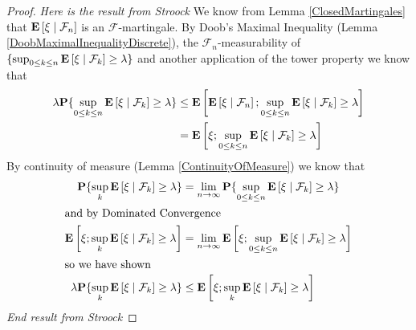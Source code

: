 \begin{proof}
\emph{Here is the result from Stroock}
We know from Lemma \ref{ClosedMartingales} that
$\textbf{E}\left[ \xi \mid \mathcal{F}_n \right]$ is an
$\mathcal{F}$-martingale.  By Doob's Maximal Inequality (Lemma
\ref{DoobMaximalInequalityDiscrete}), the
$\mathcal{F}_n$-measurability of  $\lbrace \sup_{0 \leq k
    \leq n}\textbf{E}\left[ \xi \mid \mathcal{F}_k \right] \geq \lambda \rbrace$ and another application of the
tower property we know that 
\begin{align*}
\lambda \textbf{P}\{\sup_{0 \leq k \leq n}
  \textbf{E}\left[ \xi \mid \mathcal{F}_k \right] \geq \lambda\} &\leq
\textbf{E}\left[\textbf{E}\left[ \xi \mid \mathcal{F}_n \right]; \sup_{0 \leq k
    \leq n}\textbf{E}\left[ \xi \mid \mathcal{F}_k \right] \geq \lambda\right] \\
&= \textbf{E}\left[\xi; \sup_{0 \leq k
    \leq n}\textbf{E}\left[ \xi \mid \mathcal{F}_k \right] \geq \lambda\right]
\end{align*}
By continuity of measure (Lemma \ref{ContinuityOfMeasure}) we know
that 
\begin{align*}
\textbf{P}\{\sup_{k}
  \textbf{E}\left[ \xi \mid \mathcal{F}_k \right] \geq \lambda\} &= \lim_{n \to \infty} \textbf{P}\{\sup_{0 \leq k \leq n}
  \textbf{E}\left[ \xi \mid \mathcal{F}_k \right] \geq \lambda\} \\
\intertext{and by Dominated Convergence}
\textbf{E}\left[\xi; \sup_{k}\textbf{E}\left[ \xi \mid \mathcal{F}_k \right] \geq \lambda\right] &=
\lim_{n \to \infty} \textbf{E}\left[\xi; \sup_{0 \leq k
    \leq n}\textbf{E}\left[ \xi \mid \mathcal{F}_k \right] \geq \lambda\right] \\
\intertext{so we have shown}
\lambda \textbf{P}\{\sup_{k}
  \textbf{E}\left[ \xi \mid \mathcal{F}_k \right] \geq \lambda\} &\leq
\textbf{E}\left[\xi; \sup_{k}\textbf{E}\left[ \xi \mid \mathcal{F}_k \right] \geq \lambda\right]
\end{align*}
\emph{End result from Stroock}


\end{proof}
